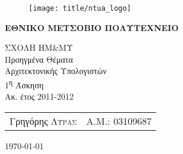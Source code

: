 \begin{titlepage}
    \begin{center}
        \begin{figure}[h] 
            \texttt{[image: title/ntua\_logo]}
        \end{figure}
        \vspace{1cm}
        \begin{LARGE}\textbf{ΕΘΝΙΚΟ ΜΕΤΣΟΒΙΟ ΠΟΛΥΤΕΧΝΕΙΟ\\[1.5cm]}\end{LARGE}
        \begin{Large}
            ΣΧΟΛΗ ΗΜ\&ΜΥ\\[2cm]
            Προηγμένα Θέματα\\
            Αρχιτεκτονικής Υπολογιστών\\[2cm]
            1\textsuperscript{η} Άσκηση\\
            Ακ. έτος 2011-2012\\
        \end{Large}
        \vfill
        \begin{flushright}
            \begin{tabular}{l r}
                {Γρηγόρης \textsc{Λύρας}}&
                {Α.Μ.: 03109687}\\
            \end{tabular}
        \end{flushright}

        \large\today\\
    \end{center}
\end{titlepage}


